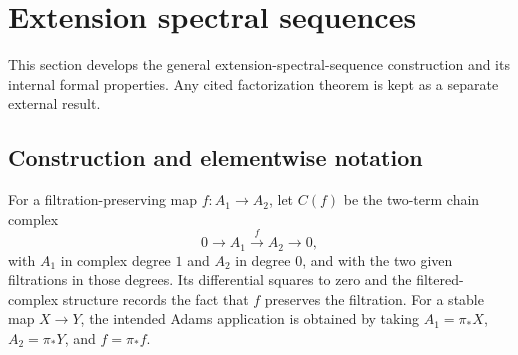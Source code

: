 \section{Extension spectral sequences}
\label{chap:extension-ss}

This section develops the general extension-spectral-sequence construction and its internal formal properties.  Any cited factorization theorem is kept as a separate external result.

\subsection{Construction and elementwise notation}

\begin{definition}
  \label{def:filtered-two-term-complex}
  \leanok
  For a filtration-preserving map $f:A_1\to A_2$, let $C(f)$ be the
  two-term chain complex
  \[
    0\longrightarrow A_1\xrightarrow{f}A_2
      \longrightarrow0,
  \]
  with $A_1$ in complex degree $1$ and $A_2$ in degree $0$, and with the two
  given filtrations in those degrees.  Its differential squares to zero and
  the filtered-complex structure records the fact that $f$ preserves the
  filtration.  For a stable map $X\to Y$, the intended Adams application is
  obtained by taking $A_1=\pi_*X$, $A_2=\pi_*Y$, and $f=\pi_*f$.
\end{definition}

